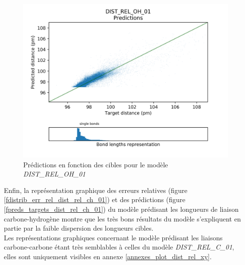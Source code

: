 \begin{figure}
	\centering
	
	\includegraphics[scale=0.7]{../figures/DIST_REL_OH_01/DIST_REL_OH_01_preds_targets.png}	
	
	\caption{Prédictions en fonction des cibles pour le modèle \emph{DIST\_REL\_OH\_01}}
	\label{fpreds_targets_dist_rel_oh_01}

\end{figure}

\par Enfin, la représentation graphique des erreurs relatives (figure \ref{fdistrib_err_rel_dist_rel_ch_01}) et des prédictions (figure \ref{fpreds_targets_dist_rel_ch_01}) du modèle prédisant les longueurs de liaison carbone-hydrogène montre que les très bons résultats du modèle s'expliquent en partie par la faible dispersion des longueurs cibles.\\
Les représentations graphiques concernant le modèle prédisant les liaisons carbone-carbone étant très semblables à celles du modèle \emph{DIST\_REL\_C\_01}, elles sont uniquement visibles en annexe \ref{annexes_plot_dist_rel_xy}.

